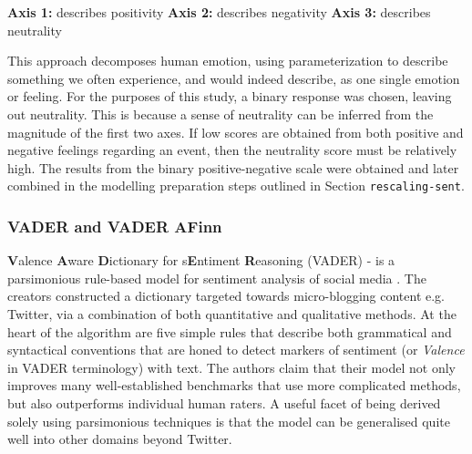 \documentclass{article}
\begin{document}
\begin{center}
   \begin{minipage}[c]{65mm} 
   \raggedright %
      \textbf{Axis 1:} describes positivity \newline
      \textbf{Axis 2:} describes negativity \newline
      \textbf{Axis 3:} describes neutrality \newline
  \end{minipage}
\end{center}

\vspace{-3mm}

This approach decomposes human emotion, using parameterization to describe something we often experience, and would indeed describe, as one single emotion or feeling. For the purposes of this study, a binary response was chosen, leaving out neutrality. This is because a sense of neutrality can be inferred from the magnitude of the first two axes. If low scores are obtained from both positive and negative feelings regarding an event, then the neutrality score must be relatively high. The results from the binary positive-negative scale were obtained and later combined in the modelling preparation steps outlined in Section \texttt{rescaling-sent}.


\subsubsection{VADER and VADER AFinn \label{vader}}
\label{sec-1-4-4}

\textbf{V}alence \textbf{A}ware \textbf{D}ictionary for s\textbf{E}ntiment \textbf{R}easoning (VADER) - is a parsimonious rule-based model for sentiment analysis of social media \cite{hutto2014vader}. The creators constructed a dictionary targeted towards micro-blogging content e.g. Twitter, via a combination of both quantitative and qualitative methods. At the heart of the algorithm are five simple rules that describe both grammatical and syntactical conventions that are honed to detect markers of sentiment (or \emph{Valence} in VADER terminology) with text. The authors claim that their model not only improves many well-established benchmarks that use more complicated methods, but also outperforms individual human raters. A useful facet of being derived solely using parsimonious techniques is that the model can be generalised quite well into other domains beyond Twitter.
\end{document}
